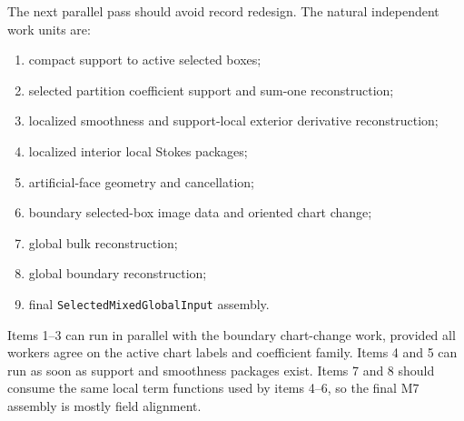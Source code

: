 \begin{theorem}
  \label{anc:m6_4_m7_parallel_theorem_queue}
  The next parallel pass should avoid record redesign.  The natural independent
  work units are:
  \begin{enumerate}
    \item compact support to active selected boxes;
    \item selected partition coefficient support and sum-one reconstruction;
    \item localized smoothness and support-local exterior derivative
      reconstruction;
    \item localized interior local Stokes packages;
    \item artificial-face geometry and cancellation;
    \item boundary selected-box image data and oriented chart change;
    \item global bulk reconstruction;
    \item global boundary reconstruction;
    \item final \texttt{SelectedMixedGlobalInput} assembly.
  \end{enumerate}
  Items 1--3 can run in parallel with the boundary chart-change work, provided
  all workers agree on the active chart labels and coefficient family.  Items
  4 and 5 can run as soon as support and smoothness packages exist.  Items 7
  and 8 should consume the same local term functions used by items 4--6, so the
  final M7 assembly is mostly field alignment.
\end{theorem}

\endgroup

